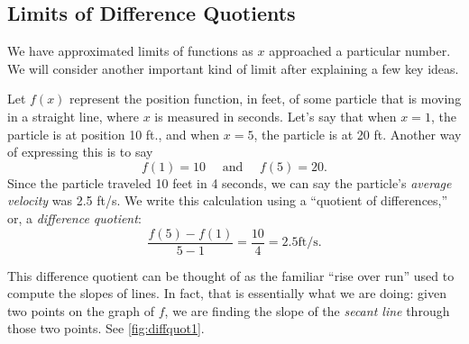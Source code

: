 \subsection{Limits of Difference Quotients}

We have approximated limits of functions as $x$ approached a particular number. We will consider another important kind of limit after explaining a few key ideas.


Let $f(x)$ represent the position function, in feet, of some particle that is moving in a straight line, where $x$ is measured in seconds. Let's say that when $x=1$, the particle is at position 10 ft., and when $x=5$, the particle is at 20 ft. Another way of expressing this is to say
\[f(1)=10 \quad \text{ and } \quad f(5) = 20.\]
Since the particle traveled 10 feet in 4 seconds, we can say the particle's \textit{average velocity} was 2.5 ft/s. We write this calculation using a ``quotient of differences,'' or, a \textit{difference quotient}:
\[\frac{f(5) - f(1)}{5-1} = \frac{10}4 = 2.5 \text{ft/s}.\]

This difference quotient can be thought of as the familiar ``rise over run'' used to compute the slopes of lines. In fact, that is essentially what we are doing: given two points on the graph of $f$, we are finding the slope of the \textit{secant line} through those two points. See \autoref{fig:diffquot1}.

